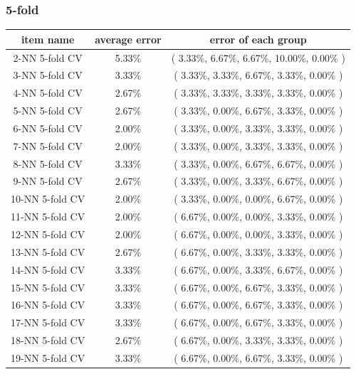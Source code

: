 \documentclass[11pt,a4paper]{article}
\begin{document}
\subsubsection{5-fold}
\begin{center}
    \begin{tabular} {|| c | c | c ||}
        \hline
        item name & average error & error of each group \\ \hline
        2-NN 5-fold CV & 5.33\% & ( 3.33\%, 6.67\%, 6.67\%, 10.00\%, 0.00\% )\\ \hline
        3-NN 5-fold CV & 3.33\% & ( 3.33\%, 3.33\%, 6.67\%, 3.33\%, 0.00\% )\\ \hline
        4-NN 5-fold CV & 2.67\% & ( 3.33\%, 3.33\%, 3.33\%, 3.33\%, 0.00\% )\\ \hline
        5-NN 5-fold CV & 2.67\% & ( 3.33\%, 0.00\%, 6.67\%, 3.33\%, 0.00\% )\\ \hline
        6-NN 5-fold CV & 2.00\% & ( 3.33\%, 0.00\%, 3.33\%, 3.33\%, 0.00\% )\\ \hline
        7-NN 5-fold CV & 2.00\% & ( 3.33\%, 0.00\%, 3.33\%, 3.33\%, 0.00\% )\\ \hline
        8-NN 5-fold CV & 3.33\% & ( 3.33\%, 0.00\%, 6.67\%, 6.67\%, 0.00\% )\\ \hline
        9-NN 5-fold CV & 2.67\% & ( 3.33\%, 0.00\%, 3.33\%, 6.67\%, 0.00\% )\\ \hline
        10-NN 5-fold CV & 2.00\% & ( 3.33\%, 0.00\%, 0.00\%, 6.67\%, 0.00\% )\\ \hline
        11-NN 5-fold CV & 2.00\% & ( 6.67\%, 0.00\%, 0.00\%, 3.33\%, 0.00\% )\\ \hline
        12-NN 5-fold CV & 2.00\% & ( 6.67\%, 0.00\%, 0.00\%, 3.33\%, 0.00\% )\\ \hline
        13-NN 5-fold CV & 2.67\% & ( 6.67\%, 0.00\%, 3.33\%, 3.33\%, 0.00\% )\\ \hline
        14-NN 5-fold CV & 3.33\% & ( 6.67\%, 0.00\%, 3.33\%, 6.67\%, 0.00\% )\\ \hline
        15-NN 5-fold CV & 3.33\% & ( 6.67\%, 0.00\%, 6.67\%, 3.33\%, 0.00\% )\\ \hline
        16-NN 5-fold CV & 3.33\% & ( 6.67\%, 0.00\%, 6.67\%, 3.33\%, 0.00\% )\\ \hline
        17-NN 5-fold CV & 3.33\% & ( 6.67\%, 0.00\%, 6.67\%, 3.33\%, 0.00\% )\\ \hline
        18-NN 5-fold CV & 2.67\% & ( 6.67\%, 0.00\%, 3.33\%, 3.33\%, 0.00\% )\\ \hline
        19-NN 5-fold CV & 3.33\% & ( 6.67\%, 0.00\%, 6.67\%, 3.33\%, 0.00\% )\\ \hline

\end{tabular}
\end{center}
\end{document}
